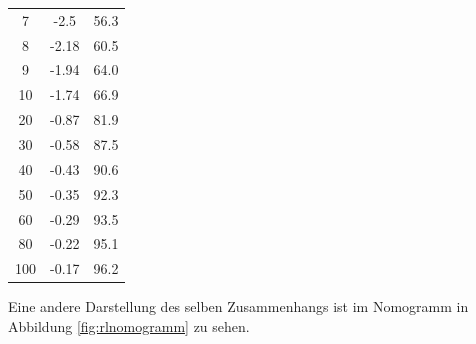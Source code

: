 \documentclass[twoside,a4paper,11pt,halfparskip,DIV=11,notitlepage]{scrartcl}
\begin{document}
\begin{table}[H]
\begin{center}
\begin{tabular}{SSS}
7 & -2.5 & 56.3\\
8 & -2.18 & 60.5\\
9 & -1.94 & 64.0\\
10 & -1.74 & 66.9\\
20 & -0.87 & 81.9\\
30 & -0.58 & 87.5\\
40 & -0.43 & 90.6\\
50 & -0.35 & 92.3\\
60 & -0.29 & 93.5\\
80 & -0.22 & 95.1\\
100& -0.17 & 96.2\\\bottomrule
\end{tabular}\end{center}
\end{table}

Eine andere Darstellung des selben Zusammenhangs ist im Nomogramm in Abbildung
\ref{fig:rlnomogramm} zu sehen.
\end{document}
